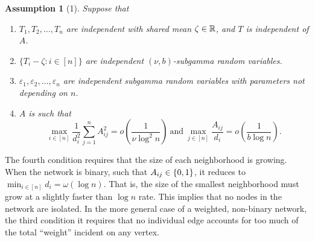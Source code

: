 \documentclass[aspectratio=169]{beamer}
\newtheorem{assumption}{Assumption}
\theoremstyle{remark}
\begin{document}
\begin{frame}

    \begin{assumption}[1]
        \label{ass:nonid}
        Suppose that
        \begin{enumerate}
            \item $T_1,T_2,\dots,T_n$ are independent with shared mean $\zeta \in \mathbb{R}$, and $T$ is independent of $A$.
            \item $\{ T_i - \zeta : i \in [n] \}$ are independent $(\nu,b)$-subgamma random variables.
            \item $\varepsilon_1, \varepsilon_2, \dots, \varepsilon_n$ are independent subgamma random variables with parameters not depending on $n$.
            \item $A$ is such that
                  \begin{equation*}
                      \max_{i \in [n]} \frac{1}{d_i^2} \sum_{j=1}^n A_{ij}^2
                      = o\left( \frac{ 1 }{ \nu \log^2 n } \right)
                      ~\text{and}~
                      \max_{j \in [n]} \frac{ A_{ij} }{ d_i }
                      = o\left( \frac{ 1 }{ b \log n } \right).
                  \end{equation*}
        \end{enumerate}
    \end{assumption}
    
    
    The fourth condition requires that the size of each neighborhood is growing. When the network is binary, such that $A_{ij} \in \{0, 1\}$, it reduces to $\min_{i \in [n]} d_i = \omega(\log n)$.
    That is, the size of the smallest neighborhood must grow at a slightly faster than $\log n$ rate. This implies that no nodes in the network are isolated. In the more general case of a weighted, non-binary network, the third condition it requires that no individual edge accounts for too much of the total ``weight'' incident on any vertex.
\end{frame}
\end{document}
